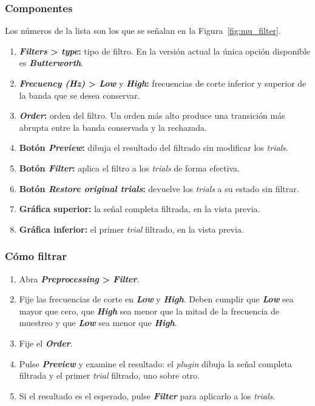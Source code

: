\documentclass[11pt,a4paper]{article}
\begin{document}
    \subsubsection*{Componentes}
    Los n\'umeros de la lista son los que se se\~nalan en la Figura~\ref{fig:mu_filter}.
    \begin{enumerate}[label=(\arabic*)]
        \item \textbf{\textit{Filters} > \textit{type}:} tipo de filtro. En la versi\'on actual la \'unica opci\'on disponible es \textbf{\textit{Butterworth}}.
        \item \textbf{\textit{Frecuency (Hz)} > \textit{Low}} y \textbf{\textit{High}:} frecuencias de corte inferior y superior de la banda que se desea conservar.
        \item \textbf{\textit{Order}:} orden del filtro. Un orden m\'as alto produce una transici\'on m\'as abrupta entre la banda conservada y la rechazada.
        \item \textbf{Bot\'on \textit{Preview}:} dibuja el resultado del filtrado sin modificar los \textit{trials}.
        \item \textbf{Bot\'on \textit{Filter}:} aplica el filtro a los \textit{trials} de forma efectiva.
        \item \textbf{Bot\'on \textit{Restore original trials}:} devuelve los \textit{trials} a su estado sin filtrar.
        \item \textbf{Gr\'afica superior:} la se\~nal completa filtrada, en la vista previa.
        \item \textbf{Gr\'afica inferior:} el primer \textit{trial} filtrado, en la vista previa.
    \end{enumerate}

    \subsubsection*{C\'omo filtrar}
    \begin{enumerate}
        \item Abra \textbf{\textit{Preprocessing} > \textit{Filter}}.
        \item Fije las frecuencias de corte en \textbf{\textit{Low}} y \textbf{\textit{High}}. Deben cumplir que \textbf{\textit{Low}} sea mayor que cero, que \textbf{\textit{High}} sea menor que la mitad de la frecuencia de muestreo y que \textbf{\textit{Low}} sea menor que \textbf{\textit{High}}.
        \item Fije el \textbf{\textit{Order}}.
        \item Pulse \textbf{\textit{Preview}} y examine el resultado: el \textit{plugin} dibuja la se\~nal completa filtrada y el primer \textit{trial} filtrado, uno sobre otro.
        \item Si el resultado es el esperado, pulse \textbf{\textit{Filter}} para aplicarlo a los \textit{trials}.
    \end{enumerate}
\end{document}
